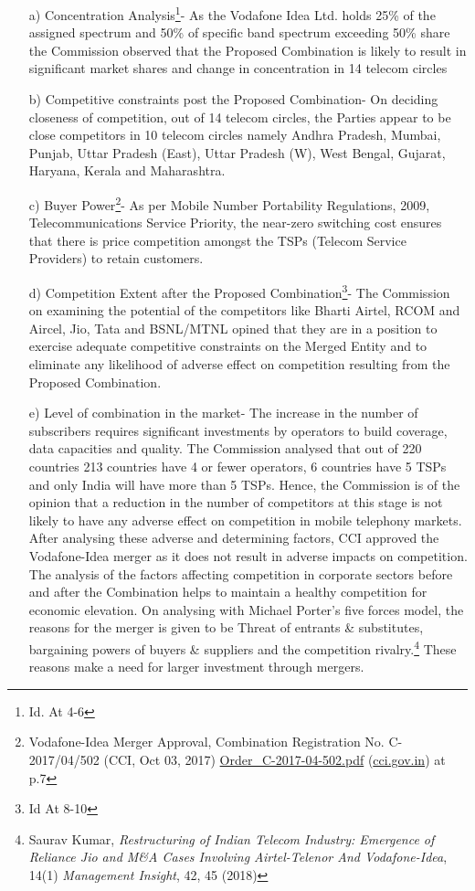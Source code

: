 \begin{multicols}{2}
\begin{enumerate}
\itemsep=0pt
\item[a)] Concentration Analysis\footnote{Id. At 4-6}- As the Vodafone Idea Ltd. holds 25\% of the assigned spectrum
and 50\% of specific band spectrum exceeding 50\% share the Commission observed that the
Proposed Combination is likely to result in significant market shares and change in
concentration in 14 telecom circles
\item[b)] Competitive constraints post the Proposed Combination- On deciding closeness of
competition, out of 14 telecom circles, the Parties appear to be close competitors in 10
telecom circles namely Andhra Pradesh, Mumbai, Punjab, Uttar Pradesh (East), Uttar
Pradesh (W), West Bengal, Gujarat, Haryana, Kerala and Maharashtra.
\item[c)] Buyer Power\footnote{Vodafone-Idea Merger Approval, Combination Registration No. C-2017/04/502 (CCI, Oct 03, 2017)
\url{Order_C-2017-04-502.pdf} (\url{cci.gov.in}) at p.7}- As per Mobile Number Portability Regulations, 2009,
Telecommunications Service Priority, the near-zero switching cost ensures that there is price
competition amongst the TSPs (Telecom Service Providers) to retain customers.
\item[d)] Competition Extent after the Proposed Combination\footnote{Id At 8-10}- The Commission on examining the
potential of the competitors like Bharti Airtel, RCOM and Aircel, Jio, Tata and BSNL/MTNL
opined that they are in a position to exercise adequate competitive constraints on the Merged
Entity and to eliminate any likelihood of adverse effect on competition resulting from the
Proposed Combination.
\item[e)] Level of combination in the market- The increase in the number of subscribers requires
significant investments by operators to build coverage, data capacities and quality. The
Commission analysed that out of 220 countries 213 countries have 4 or fewer operators, 6
countries have 5 TSPs and only India will have more than 5 TSPs. Hence, the Commission is
of the opinion that a reduction in the number of competitors at this stage is not likely to have
any adverse effect on competition in mobile telephony markets. After analysing these adverse
and determining factors, CCI approved the Vodafone-Idea merger as it does not result in
adverse impacts on competition. The analysis of the factors affecting competition in
corporate sectors before and after the Combination helps to maintain a healthy competition
for economic elevation. On analysing with Michael Porter’s five forces model, the reasons
for the merger is given to be Threat of entrants \& substitutes, bargaining powers of buyers \&
suppliers and the competition rivalry.\footnote{Saurav Kumar, \textit{Restructuring of Indian Telecom Industry: Emergence of Reliance Jio and M\&A Cases
Involving Airtel-Telenor And Vodafone-Idea}, 14(1) \textit{Management Insight}, 42, 45 (2018)} These reasons make a need for larger investment
through mergers.
\end{enumerate}


\end{multicols}
